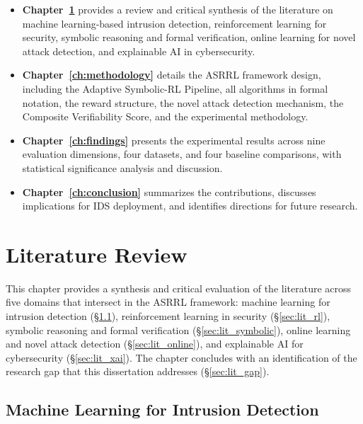 \documentclass[12pt, letterpaper, oneside]{report}
\newcommand{\ASRRL}{\textsc{ASRRL}}
\begin{document}
\begin{itemize}
    \item \textbf{Chapter~\ref{ch:literature}} provides a review and critical synthesis of the literature on machine learning-based intrusion detection, reinforcement learning for security, symbolic reasoning and formal verification, online learning for novel attack detection, and explainable AI in cybersecurity.

    \item \textbf{Chapter~\ref{ch:methodology}} details the \ASRRL{} framework design, including the Adaptive Symbolic-RL Pipeline, all algorithms in formal notation, the reward structure, the novel attack detection mechanism, the Composite Verifiability Score, and the experimental methodology.

    \item \textbf{Chapter~\ref{ch:findings}} presents the experimental results across nine evaluation dimensions, four datasets, and four baseline comparisons, with statistical significance analysis and discussion.

    \item \textbf{Chapter~\ref{ch:conclusion}} summarizes the contributions, discusses implications for IDS deployment, and identifies directions for future research.
\end{itemize}



\chapter{Literature Review}
\label{ch:literature}

This chapter provides a synthesis and critical evaluation of the literature across five domains that intersect in the \ASRRL{} framework: machine learning for intrusion detection (\S\ref{sec:lit_ml}), reinforcement learning in security (\S\ref{sec:lit_rl}), symbolic reasoning and formal verification (\S\ref{sec:lit_symbolic}), online learning and novel attack detection (\S\ref{sec:lit_online}), and explainable AI for cybersecurity (\S\ref{sec:lit_xai}). The chapter concludes with an identification of the research gap that this dissertation addresses (\S\ref{sec:lit_gap}).


\section{Machine Learning for Intrusion Detection}
\label{sec:lit_ml}
\end{document}
